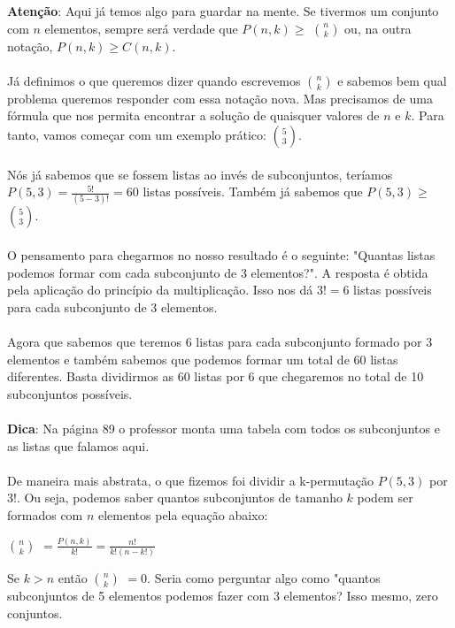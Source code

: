 \documentclass[a4paper,11pt]{book}
\theoremstyle{definition}
\theoremstyle{break}
\begin{document}
\textbf{Atenção}: Aqui já temos algo para guardar na mente. Se tivermos um conjunto com $n$ elementos, sempre será verdade que $P(n,k) \geqslant $ $n \choose k$ ou, na outra notação, $P(n,k) \geqslant C(n,k)$.
\\
\\
Já definimos o que queremos dizer quando escrevemos $n \choose k$ e sabemos bem qual problema queremos responder com essa notação nova. Mas precisamos de uma fórmula que nos permita encontrar a solução de quaisquer valores de $n$ e $k$. Para tanto, vamos começar com um exemplo prático: $5 \choose 3$.
\\
\\
Nós já sabemos que se fossem listas ao invés de subconjuntos, teríamos $P(5,3) = \frac{5!}{(5 - 3)!} = 60$ listas possíveis. Também já sabemos que $P(5,3) \geqslant $ $5 \choose 3$.
\\
\\
O pensamento para chegarmos no nosso resultado é o seguinte: "Quantas listas podemos formar com cada subconjunto de 3 elementos?". A resposta é obtida pela aplicação do princípio da multiplicação. Isso nos dá $3! = 6$ listas possíveis para cada subconjunto de 3 elementos.
\\
\\
Agora que sabemos que teremos 6 listas para cada subconjunto formado por 3 elementos e também sabemos que podemos formar um total de 60 listas diferentes. Basta dividirmos as 60 listas por 6 que chegaremos no total de 10 subconjuntos possíveis.
\\
\\
\textbf{Dica}: Na página 89 o professor monta uma tabela com todos os subconjuntos e as listas que falamos aqui.
\\
\\
De maneira mais abstrata, o que fizemos foi dividir a k-permutação $P(5,3)$ por $3!$. Ou seja, podemos saber quantos subconjuntos de tamanho $k$ podem ser formados com $n$ elementos pela equação abaixo:

\begin{center}
	\LARGE $n \choose k$ $ = \frac{P(n,k)}{k!} = \frac{n!}{k!(n-k!)}$
\end{center}

Se $k > n$ então $n \choose k$ $= 0$. Seria como perguntar algo como "quantos subconjuntos de 5 elementos podemos fazer com 3 elementos? Isso mesmo, zero conjuntos.
\end{document}
